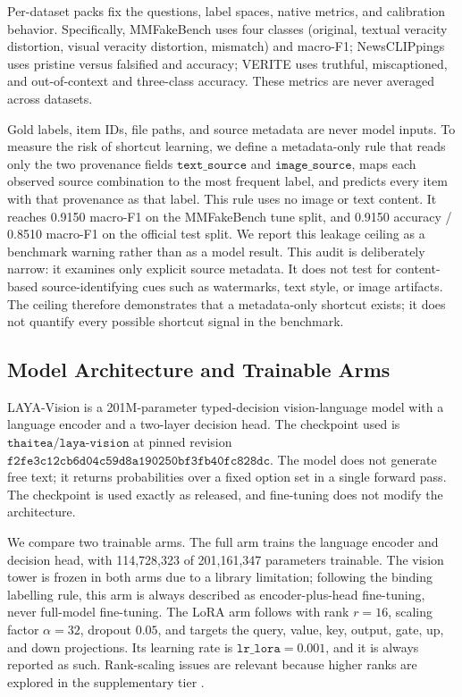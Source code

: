 \documentclass{article} %
\begin{document}
Per-dataset packs fix the questions, label spaces, native metrics, and calibration behavior. Specifically, MMFakeBench uses four classes (original, textual veracity distortion, visual veracity distortion, mismatch) and macro-F1; NewsCLIPpings uses pristine versus falsified and accuracy; VERITE uses truthful, miscaptioned, and out-of-context and three-class accuracy. These metrics are never averaged across datasets.

Gold labels, item IDs, file paths, and source metadata are never model inputs. To measure the risk of shortcut learning, we define a metadata-only rule that reads only the two provenance fields \( \texttt{text\_source} \) and \( \texttt{image\_source} \), maps each observed source combination to the most frequent label, and predicts every item with that provenance as that label. This rule uses no image or text content. It reaches 0.9150 macro-F1 on the MMFakeBench tune split, and 0.9150 accuracy / 0.8510 macro-F1 on the official test split. We report this leakage ceiling as a benchmark warning rather than as a model result. This audit is deliberately narrow: it examines only explicit source metadata. It does not test for content-based source-identifying cues such as watermarks, text style, or image artifacts. The ceiling therefore demonstrates that a metadata-only shortcut exists; it does not quantify every possible shortcut signal in the benchmark.

\subsection{Model Architecture and Trainable Arms}
LAYA-Vision is a 201M-parameter typed-decision vision-language model with a language encoder and a two-layer decision head. The checkpoint used is \( \texttt{thaitea/laya-vision} \) at pinned revision \( \texttt{f2fe3c12cb6d04c59d8a190250bf3fb40fc828dc} \). The model does not generate free text; it returns probabilities over a fixed option set in a single forward pass. The checkpoint is used exactly as released, and fine-tuning does not modify the architecture.

We compare two trainable arms. The full arm trains the language encoder and decision head, with 114,728,323 of 201,161,347 parameters trainable. The vision tower is frozen in both arms due to a library limitation; following the binding labelling rule, this arm is always described as encoder-plus-head fine-tuning, never full-model fine-tuning. The LoRA arm follows \citet{Hu2021LoraLowrank} with rank \(r=16\), scaling factor \( \alpha=32\), dropout \(0.05\), and targets the query, value, key, output, gate, up, and down projections. Its learning rate is \( \texttt{lr\_lora}=0.001\), and it is always reported as such. Rank-scaling issues are relevant because higher ranks are explored in the supplementary tier \citep{Kalajdzievski2023RankStabilization}.
\end{document}
